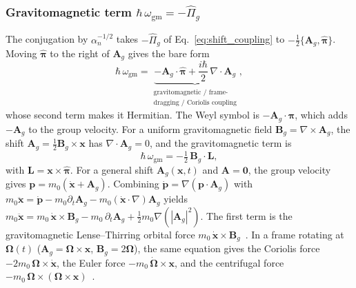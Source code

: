 \documentclass[aps,prd,onecolumn,tightenlines,nofootinbib,notitlepage,11pt,floatfix]{revtex4-2}
\theoremstyle{indentedtheorem}
\begin{document}
\subsubsection{Gravitomagnetic term \texorpdfstring{$\hbar\,\omega_\text{gm}=-\hat{\Pi}_g$}{hbar omega gm}}
\label{sec:term_gm}

The conjugation by $\alpha_n^{-1/2}$ takes $-\hat{\Pi}_g$ of Eq.~\eqref{eq:shift_coupling} to $-\tfrac{1}{2}\{\mathbf{A}_g,\hat{\boldsymbol{\pi}}\}$. Moving $\hat{\boldsymbol{\pi}}$ to the right of $\mathbf{A}_g$ gives the bare form
\begin{equation}
    \hbar\,\omega_\text{gm} = \underbrace{-\mathbf{A}_g\cdot\hat{\boldsymbol{\pi}} + \frac{i\hbar}{2}\,\nabla\cdot\mathbf{A}_g}_{\substack{\text{gravitomagnetic / frame-} \\ \text{dragging / Coriolis coupling}}} ,
    \label{eq:gm_expanded}
\end{equation}
whose second term makes it Hermitian. The Weyl symbol is $-\mathbf{A}_g\cdot\boldsymbol{\pi}$, which adds $-\mathbf{A}_g$ to the group velocity. For a uniform gravitomagnetic field $\mathbf{B}_g = \nabla\times\mathbf{A}_g$, the shift $\mathbf{A}_g = \tfrac{1}{2}\mathbf{B}_g\times\mathbf{x}$ has $\nabla\cdot\mathbf{A}_g=0$, and the gravitomagnetic term is
\begin{equation}
    \hbar\,\omega_\text{gm} = -\tfrac{1}{2}\,\mathbf{B}_g\cdot\mathbf{L} ,
    \label{eq:gm_orbital}
\end{equation}
with $\mathbf{L}=\mathbf{x}\times\hat{\boldsymbol{\pi}}$. For a general shift $\mathbf{A}_g(\mathbf{x},t)$ and $\mathbf{A}=\mathbf{0}$, the group velocity gives $\mathbf{p}=m_0(\dot{\mathbf{x}}+\mathbf{A}_g)$. Combining $\dot{\mathbf{p}}=\nabla(\mathbf{p}\cdot\mathbf{A}_g)$ with $m_0\ddot{\mathbf{x}}=\dot{\mathbf{p}}-m_0\partial_t\mathbf{A}_g-m_0(\dot{\mathbf{x}}\cdot\nabla)\mathbf{A}_g$ yields $m_0\ddot{\mathbf{x}} = m_0\,\dot{\mathbf{x}}\times\mathbf{B}_g - m_0\,\partial_t\mathbf{A}_g + \tfrac{1}{2}m_0\nabla(|\mathbf{A}_g|^2)$. The first term is the gravitomagnetic Lense--Thirring orbital force $m_0\,\dot{\mathbf{x}}\times\mathbf{B}_g$~\citep{Lense1918FrameDragging}. In a frame rotating at $\boldsymbol{\Omega}(t)$ ($\mathbf{A}_g=\boldsymbol{\Omega}\times\mathbf{x}$, $\mathbf{B}_g=2\boldsymbol{\Omega}$), the same equation gives the Coriolis force $-2m_0\,\boldsymbol{\Omega}\times\dot{\mathbf{x}}$, the Euler force $-m_0\,\dot{\boldsymbol{\Omega}}\times\mathbf{x}$, and the centrifugal force $-m_0\,\boldsymbol{\Omega}\times(\boldsymbol{\Omega}\times\mathbf{x})$~\citep{Goldstein2002Classical,HehlNi1990Inertial}.
\end{document}
